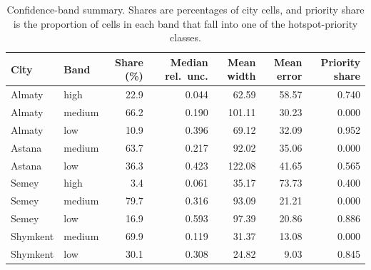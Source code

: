 \begin{table}[H]
\centering
\small
\caption{Confidence-band summary. Shares are percentages of city cells, and priority share is the proportion of cells in each band that fall into one of the hotspot-priority classes.}
\label{tab:confidence-bands-unified}
\begin{tabular}{llrrrrr}
\toprule
City & Band & Share (\%) & Median rel.\ unc. & Mean width & Mean error & Priority share \\
\midrule
Almaty   & high   & 22.9 & 0.044 & 62.59  & 58.57 & 0.740 \\
Almaty   & medium & 66.2 & 0.190 & 101.11 & 30.23 & 0.000 \\
Almaty   & low    & 10.9 & 0.396 & 69.12  & 32.09 & 0.952 \\
Astana   & medium & 63.7 & 0.217 & 92.02  & 35.06 & 0.000 \\
Astana   & low    & 36.3 & 0.423 & 122.08 & 41.65 & 0.565 \\
Semey    & high   & 3.4  & 0.061 & 35.17  & 73.73 & 0.400 \\
Semey    & medium & 79.7 & 0.316 & 93.09  & 21.21 & 0.000 \\
Semey    & low    & 16.9 & 0.593 & 97.39  & 20.86 & 0.886 \\
Shymkent & medium & 69.9 & 0.119 & 31.37  & 13.08 & 0.000 \\
Shymkent & low    & 30.1 & 0.308 & 24.82  & 9.03  & 0.845 \\
\bottomrule
\end{tabular}
\end{table}

